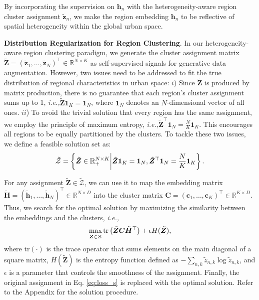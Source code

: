 \documentclass[letterpaper]{article} \usepackage{aaai23}  \usepackage{times}  \usepackage{helvet}  \usepackage{courier}  \usepackage[hyphens]{url}  \usepackage{graphicx} \urlstyle{rm} \def\UrlFont{\rm}  \usepackage{natbib}  \usepackage{caption} \frenchspacing  \setlength{\pdfpagewidth}{8.5in} \setlength{\pdfpageheight}{11in}
\newcommand{\ie}{\emph{i.e.,}\xspace}
\begin{document}
By incorporating the supervision on ${\bm h}_n$ with the heterogeneity-aware region cluster assignment $\tilde{\bm z}_n$, we make the region embedding ${\bm h}_n$ to be reflective of spatial heterogeneity within the global urban space.\\\vspace{-0.12in}



\noindent \textbf{Distribution Regularization for Region Clustering}.
In our heterogeneity-aware region clustering paradigm, we generate the cluster assignment matrix $\tilde{\bm Z} = (\tilde{\bm z}_1, \dots, \tilde{\bm z}_N)^\top \in \mathbb{R}^{N \times K}$ as self-supervised signals for generative data augmentation. However, two issues need to be addressed to fit the true distribution of regional characteristics in urban space: $i$) Since $\tilde{\bm Z}$ is produced by matrix production, there is no guarantee that each region's cluster assignment sums up to 1, \ie $\tilde{\bm Z} \bm 1_K = \bm 1_N$, where $\bm 1_N$ denotes an $N$-dimensional vector of all ones. $ii$) To avoid the trivial solution that every region has the same assignment, we employ the principle of maximum entropy, \ie $\tilde{\bm Z}^\top \bm 1_N = \frac{N}{K} \bm 1_K$. This encourages all regions to be equally partitioned by the clusters. To tackle these two issues, we define a feasible solution set as:
\begin{equation}\small
    \tilde{\mathcal{Z}} = \left\{\tilde{\bm Z} \in \mathbb{R}_{+}^{N \times K} \middle| \tilde{\bm Z} \bm 1_K = \bm 1_N, \tilde{\bm Z}^\top \bm 1_N = \frac{N}{K} \bm 1_K \right\}.
\end{equation}



For any assignment $\tilde{\bm Z} \in \tilde{\mathcal{Z}}$, we can use it to map the embedding matrix $\tilde{\bm H} = (\tilde{\bm h}_1, \dots, \tilde{\bm h}_N)^\top \in \mathbb{R}^{N \times D}$ into the cluster matrix $\bm C = (\bm c_1, \dots, \bm c_K)^\top \in \mathbb{R}^{K \times D}$. Thus, we search for the optimal solution by maximizing the similarity between the embeddings and the clusters, \ie 
\begin{equation}\small
    \max_{\tilde{\bm Z} \in \mathcal{Z}} \mathrm{tr}\left(\tilde{\bm Z} \bm C \tilde{\bm H}^\top\right) + \epsilon H(\tilde{\bm Z}), 
\end{equation}
where $\mathrm{tr}(\cdot)$ is the trace operator that sums elements on the main diagonal of a square matrix, $H(\tilde{\bm Z})$ is the entropy function defined as $- \sum_{n,k} \tilde{z}_{n,k}\log \tilde{z}_{n,k}$, and $\epsilon$ is a parameter that controls the smoothness of the assignment. Finally, the original assignment in Eq. \eqref{eq:loss_s} is replaced with the optimal solution. Refer to the Appendix for the solution procedure.
\end{document}
